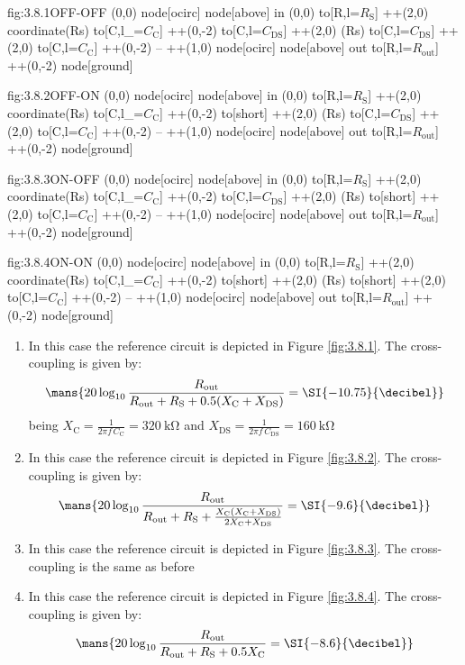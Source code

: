 \begin{circuit}{fig:3.8.1}{OFF-OFF}
    (0,0) node[ocirc] {}
    node[above] {in}
    (0,0) to[R,l=$R_\text{S}$] ++(2,0) coordinate(Rs)
    to[C,l_=$C_\text{C}$] ++(0,-2)
    to[C,l=$C_\text{DS}$] ++(2,0)
    (Rs) to[C,l=$C_\text{DS}$] ++(2,0)
    to[C,l=$C_\text{C}$] ++(0,-2) 
    -- ++(1,0)
    node[ocirc] {}
    node[above] {out}
    to[R,l=$R_\text{out}$] ++(0,-2)
    node[ground] {}
\end{circuit}
\begin{circuit}{fig:3.8.2}{OFF-ON}
    (0,0) node[ocirc] {}
    node[above] {in}
    (0,0) to[R,l=$R_\text{S}$] ++(2,0) coordinate(Rs)
    to[C,l_=$C_\text{C}$] ++(0,-2)
    to[short] ++(2,0)
    (Rs) to[C,l=$C_\text{DS}$] ++(2,0)
    to[C,l=$C_\text{C}$] ++(0,-2) 
    -- ++(1,0)
    node[ocirc] {}
    node[above] {out}
    to[R,l=$R_\text{out}$] ++(0,-2)
    node[ground] {}
\end{circuit}
\begin{circuit}{fig:3.8.3}{ON-OFF}
    (0,0) node[ocirc] {}
    node[above] {in}
    (0,0) to[R,l=$R_\text{S}$] ++(2,0) coordinate(Rs)
    to[C,l_=$C_\text{C}$] ++(0,-2)
    to[C,l=$C_\text{DS}$] ++(2,0)
    (Rs) to[short] ++(2,0)
    to[C,l=$C_\text{C}$] ++(0,-2) 
    -- ++(1,0)
    node[ocirc] {}
    node[above] {out}
    to[R,l=$R_\text{out}$] ++(0,-2)
    node[ground] {}
\end{circuit}
\begin{circuit}{fig:3.8.4}{ON-ON}
    (0,0) node[ocirc] {}
    node[above] {in}
    (0,0) to[R,l=$R_\text{S}$] ++(2,0) coordinate(Rs)
    to[C,l_=$C_\text{C}$] ++(0,-2)
    to[short] ++(2,0)
    (Rs) to[short] ++(2,0)
    to[C,l=$C_\text{C}$] ++(0,-2) 
    -- ++(1,0)
    node[ocirc] {}
    node[above] {out}
    to[R,l=$R_\text{out}$] ++(0,-2)
    node[ground] {}
\end{circuit}

\begin{enumerate}
\item In this case the reference circuit is depicted in Figure \ref{fig:3.8.1}. The cross-coupling is given by:
\[\mans{20\log_{10}\frac{R_\text{out}}{R_\text{out}+R_\text{S}+0.5(X_\text{C}+X_\text{DS})}=\SI{-10.75}{\decibel}}\]
being $X_\text{C}=\frac{1}{2\pi f\,C_\text{C}}=\SI{320}{\kilo\ohm}$ and $X_\text{DS}=\frac{1}{2\pi f\,C_\text{DS}}=\SI{160}{\kilo\ohm}$
\item In this case the reference circuit is depicted in Figure \ref{fig:3.8.2}. The cross-coupling is given by:
\[\mans{20\log_{10}\frac{R_\text{out}}{R_\text{out}+R_\text{S}+\frac{X_\text{C}(X_\text{C}+X_\text{DS})}{2X_\text{C}+X_\text{DS}}}=\SI{-9.6}{\decibel}}\]
\item In this case the reference circuit is depicted in Figure \ref{fig:3.8.3}. The cross-coupling is the same as before
\item In this case the reference circuit is depicted in Figure \ref{fig:3.8.4}. The cross-coupling is given by:
\[\mans{20\log_{10}\frac{R_\text{out}}{R_\text{out}+R_\text{S}+0.5X_\text{C}}=\SI{-8.6}{\decibel}}\]
\end{enumerate}
